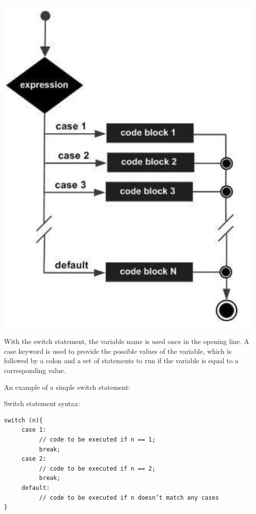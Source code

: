 \begin{center}
    \includegraphics[width = \textwidth /2]{images/switchdiagram.png}
\end{center}

With the switch statement, the variable name is used once in the opening line. A case keyword is used to provide the possible values of the variable, which is followed by a colon and a set of statements to run if the variable is equal to a corresponding value.

An example of a simple switch statement:

\begin{example}
    Switch statement syntax:
\begin{verbatim}
switch (n){
     case 1:
          // code to be executed if n == 1;
          break;
     case 2:
          // code to be executed if n == 2;
          break;
     default:
          // code to be executed if n doesn’t match any cases
}
\end{verbatim}
\end{example}

